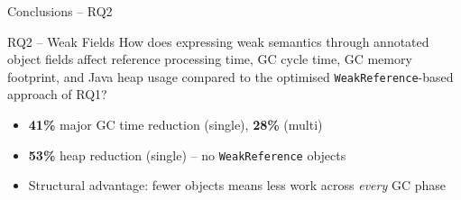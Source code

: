 \documentclass[aspectratio=169]{beamer}
\begin{document}
\begin{frame}{Conclusions -- RQ2}
    \begin{block}{RQ2 -- Weak Fields}
        \small
        How does expressing weak semantics through annotated object fields affect
        reference processing time, GC cycle time, GC memory footprint, and Java heap
        usage compared to the optimised \texttt{WeakReference}-based approach of RQ1?
        \vspace{0.6em}
        \begin{itemize}
            \item \textbf{41\%} major GC time reduction (single), \textbf{28\%} (multi)
            \item \textbf{53\%} heap reduction (single) -- no \texttt{WeakReference} objects
            \item Structural advantage: fewer objects means less work across \emph{every} GC phase
        \end{itemize}
    \end{block}
\end{frame}
\end{document}
